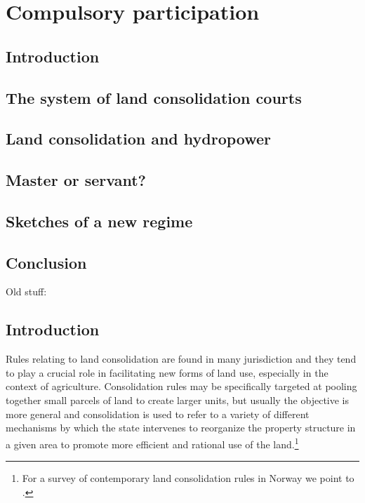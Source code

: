 \chapter{Compulsory participation}\label{chap:6}

\section{Introduction}\label{sec:intro6}

\section{The system of land consolidation courts}

\section{Land consolidation and hydropower}

\section{Master or servant?}

\section{Sketches of a new regime}

\section{Conclusion}

Old stuff:

\section{Introduction}\label{intro}

Rules relating to land consolidation are found in many jurisdiction and they tend to play a crucial role in facilitating new forms of land use, especially in the context of agriculture. Consolidation rules may be specifically targeted at pooling together small parcels of land to create larger units, but usually the objective is more general and consolidation is used to refer to a variety of different mechanisms by which the state intervenes to reorganize the property structure in a given area to promote more efficient and rational use of the land.\footnote{For a survey of contemporary land consolidation rules in Norway we point to \cite{vittikainen2004}.}

